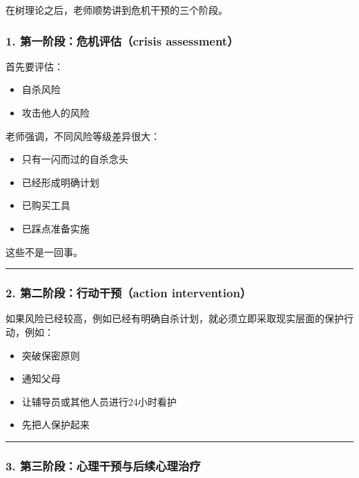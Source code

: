\documentclass[
  chinese,
  9pt,
  a4paper,
]{ctexart}
\providecommand{\tightlist}{%
  \setlength{\itemsep}{0pt}\setlength{\parskip}{0pt}}
\begin{document}
在树理论之后，老师顺势讲到危机干预的三个阶段。

\subsubsection{1. 第一阶段：危机评估（crisis
assessment）}\label{ux7b2cux4e00ux9636ux6bb5ux5371ux673aux8bc4ux4f30crisis-assessment}

首先要评估：

\begin{itemize}
\tightlist
\item
  自杀风险
\item
  攻击他人的风险
\end{itemize}

老师强调，不同风险等级差异很大：

\begin{itemize}
\tightlist
\item
  只有一闪而过的自杀念头
\item
  已经形成明确计划
\item
  已购买工具
\item
  已踩点准备实施
\end{itemize}

这些不是一回事。

\begin{center}\rule{0.5\linewidth}{0.5pt}\end{center}

\subsubsection{2. 第二阶段：行动干预（action
intervention）}\label{ux7b2cux4e8cux9636ux6bb5ux884cux52a8ux5e72ux9884action-intervention}

如果风险已经较高，例如已经有明确自杀计划，就必须立即采取现实层面的保护行动，例如：

\begin{itemize}
\tightlist
\item
  突破保密原则
\item
  通知父母
\item
  让辅导员或其他人员进行24小时看护
\item
  先把人保护起来
\end{itemize}

\begin{center}\rule{0.5\linewidth}{0.5pt}\end{center}

\subsubsection{3.
第三阶段：心理干预与后续心理治疗}\label{ux7b2cux4e09ux9636ux6bb5ux5fc3ux7406ux5e72ux9884ux4e0eux540eux7eedux5fc3ux7406ux6cbbux7597}
\end{document}
